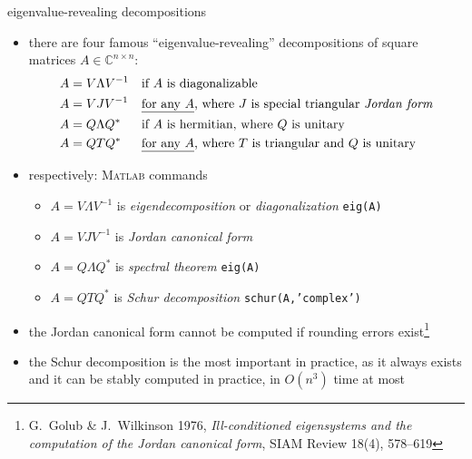 \documentclass[10pt,hyperref]{beamer}
\newcommand{\CC}{\mathbb{C}}
\newcommand{\Matlab}{\textsc{Matlab}\xspace}
\begin{document}
\begin{frame}{eigenvalue-revealing decompositions}

\begin{itemize}  
\item there are four famous ``eigenvalue-revealing'' decompositions of square matrices $A\in\CC^{n\times n}$:
\begin{align*}
A &= V \Lambda V^{-1} & &\text{if $A$ is diagonalizable} \\
A &= V J V^{-1} & &\text{\underline{for any $A$}, where $J$ is special triangular \emph{Jordan form}} \\
A &= Q \Lambda Q^* & &\text{if $A$ is hermitian, where $Q$ is unitary} \\
A &= Q T Q^* & &\text{\underline{for any $A$}, where $T$ is triangular and $Q$ is unitary}
\end{align*}
\item respectively: \hfill \small \Matlab commands\normalsize
    \begin{itemize}
    \item[] $A = V \Lambda V^{-1}$ is \emph{eigendecomposition} or \emph{diagonalization} \hfill \texttt{eig(A)}
    \item[] $A = V J V^{-1}$ is \emph{Jordan canonical form}
    \item[] $A = Q \Lambda Q^*$ is \emph{spectral theorem} \hfill \texttt{eig(A)}
    \item[] $A = Q T Q^*$ is \emph{Schur decomposition} \hfill \texttt{schur(A,'complex')}
    \end{itemize}

\medskip
\item the Jordan canonical form cannot be computed if rounding errors exist\footnote{\tiny G.~Golub \& J.~Wilkinson 1976, \emph{Ill-conditioned eigensystems and the computation of the Jordan canonical form}, SIAM Review 18(4), 578--619}
\item the Schur decomposition is the most important in practice, as it always exists and it can be stably computed in practice, in $O(n^3)$ time at most
\end{itemize}
\end{frame}
\end{document}

